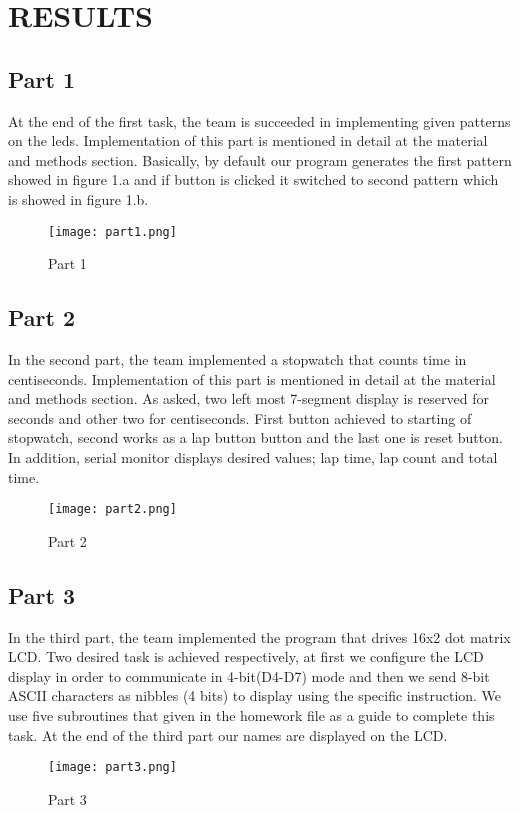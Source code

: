 \documentclass[pdftex,12pt,a4paper]{article}
\begin{document}
\newpage
\section{RESULTS }
\subsection{Part 1}
At the end of the first task, the team is succeeded in implementing given patterns on the
leds. Implementation of this part is mentioned in detail at the material and methods section. Basically, by default our program generates the first pattern showed in figure 1.a and if button is clicked it switched to second pattern which is showed in figure 1.b.
\begin{figure}[H]
	\centering
	\texttt{[image: part1.png]}
	\caption{Part 1}
\end{figure}
 
\subsection{Part 2}
In the second part, the team implemented a stopwatch that counts time in centiseconds. Implementation of this part is mentioned in detail at the material and methods section. As asked, two left most 7-segment display is reserved for seconds and other two for centiseconds. First button achieved to starting of stopwatch, second works as a lap button button and the last one is reset button. In addition, serial monitor displays desired values; lap time, lap count and total time.
\begin{figure}[H]
	\centering
	\texttt{[image: part2.png]}
	\caption{Part 2}
\end{figure}
\subsection{Part 3}
In the third part, the team implemented the program that drives 16x2 dot matrix LCD. Two desired task is achieved respectively, at first we configure the LCD display in order to communicate in 4-bit(D4-D7) mode and then we send 8-bit ASCII characters as nibbles (4 bits) to display using the specific instruction. We use five subroutines that given in the homework file as a guide to complete this task. At the end of the third part our names are displayed on the LCD.
\begin{figure}[H]
	\centering
	\texttt{[image: part3.png]}
	\caption{Part 3}
\end{figure}
\end{document}
